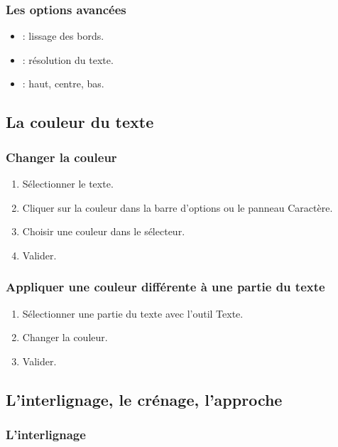 \subsubsection{Les options avancées}

\begin{itemize}
    \item {} : lissage des bords.
    \item {} : résolution du texte.
    \item {} : haut, centre, bas.
\end{itemize}

\subsection{La couleur du texte}

\subsubsection{Changer la couleur}

\begin{enumerate}
    \item Sélectionner le texte.
    \item Cliquer sur la couleur dans la barre d'options ou le panneau Caractère.
    \item Choisir une couleur dans le sélecteur.
    \item Valider.
\end{enumerate}

\subsubsection{Appliquer une couleur différente à une partie du texte}

\begin{enumerate}
    \item Sélectionner une partie du texte avec l'outil Texte.
    \item Changer la couleur.
    \item Valider.
\end{enumerate}

\subsection{L'interlignage, le crénage, l'approche}

\subsubsection{L'interlignage}


